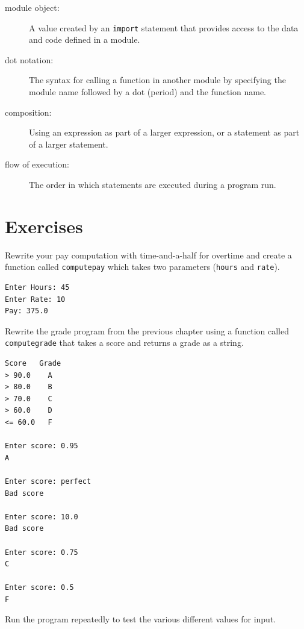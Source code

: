 \documentclass[10pt]{book}
\begin{document}
\begin{description}
\item[module object:] A value created by an {\tt import} statement
that provides access to the data and code defined in a module.

\item[dot notation:]  The syntax for calling a function in another
module by specifying the module name followed by a dot (period) and
the function name.

\item[composition:] Using an expression as part of a larger expression,
or a statement as part of a larger statement.

\item[flow of execution:]  The order in which statements are executed during
a program run.


\end{description}


\section{Exercises}

\begin{ex}
Rewrite your pay computation with time-and-a-half for overtime
and create a function called {\tt computepay} which takes
two parameters ({\tt hours} and {\tt rate}).

\begin{verbatim}
Enter Hours: 45
Enter Rate: 10
Pay: 375.0
\end{verbatim}
\end{ex}

\begin{ex}
Rewrite the grade program from the previous chapter 
using a function called {\tt computegrade} that takes
a score and returns a grade as a string.

\begin{verbatim}
Score   Grade
> 90.0    A
> 80.0    B
> 70.0    C
> 60.0    D
<= 60.0   F

Enter score: 0.95
A

Enter score: perfect
Bad score

Enter score: 10.0
Bad score

Enter score: 0.75
C

Enter score: 0.5
F
\end{verbatim}

Run the program repeatedly to test the various different values
for input.
\end{ex}
\end{document}
